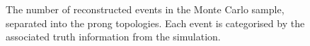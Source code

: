 \begin{figure}
  \centering
  \caption{The number of reconstructed events in the Monte Carlo sample, separated into the prong topologies.  Each event is categorised by the associated truth information from the simulation.}
  \label{fig:ProngStackAll}
\end{figure}
